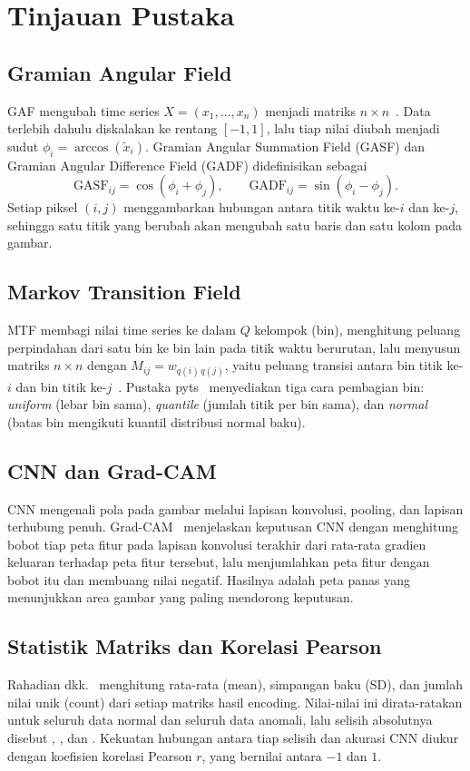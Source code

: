 \section{Tinjauan Pustaka}

\subsection{Gramian Angular Field}
GAF mengubah time series $X=(x_1,\dots,x_n)$ menjadi matriks $n \times n$~\cite{wang2015}. Data terlebih dahulu diskalakan ke rentang $[-1,1]$, lalu tiap nilai diubah menjadi sudut $\phi_i=\arccos(\tilde{x}_i)$. Gramian Angular Summation Field (GASF) dan Gramian Angular Difference Field (GADF) didefinisikan sebagai
\begin{equation}
\mathrm{GASF}_{ij}=\cos(\phi_i+\phi_j), \qquad \mathrm{GADF}_{ij}=\sin(\phi_i-\phi_j).
\end{equation}
Setiap piksel $(i,j)$ menggambarkan hubungan antara titik waktu ke-$i$ dan ke-$j$, sehingga satu titik yang berubah akan mengubah satu baris dan satu kolom pada gambar.

\subsection{Markov Transition Field}
MTF membagi nilai time series ke dalam $Q$ kelompok (bin), menghitung peluang perpindahan dari satu bin ke bin lain pada titik waktu berurutan, lalu menyusun matriks $n\times n$ dengan $M_{ij}=w_{q(i)\,q(j)}$, yaitu peluang transisi antara bin titik ke-$i$ dan bin titik ke-$j$~\cite{wang2015}. Pustaka pyts~\cite{faouzi2020} menyediakan tiga cara pembagian bin: \textit{uniform} (lebar bin sama), \textit{quantile} (jumlah titik per bin sama), dan \textit{normal} (batas bin mengikuti kuantil distribusi normal baku).

\subsection{CNN dan Grad-CAM}
CNN mengenali pola pada gambar melalui lapisan konvolusi, pooling, dan lapisan terhubung penuh. Grad-CAM~\cite{selvaraju2017} menjelaskan keputusan CNN dengan menghitung bobot tiap peta fitur pada lapisan konvolusi terakhir dari rata-rata gradien keluaran terhadap peta fitur tersebut, lalu menjumlahkan peta fitur dengan bobot itu dan membuang nilai negatif. Hasilnya adalah peta panas yang menunjukkan area gambar yang paling mendorong keputusan.

\subsection{Statistik Matriks dan Korelasi Pearson}
Rahadian dkk.~\cite{rahadian2023} menghitung rata-rata (mean), simpangan baku (SD), dan jumlah nilai unik (count) dari setiap matriks hasil encoding. Nilai-nilai ini dirata-ratakan untuk seluruh data normal dan seluruh data anomali, lalu selisih absolutnya disebut \dmean, \dsd, dan \dcount. Kekuatan hubungan antara tiap selisih dan akurasi CNN diukur dengan koefisien korelasi Pearson $r$, yang bernilai antara $-1$ dan $1$.
